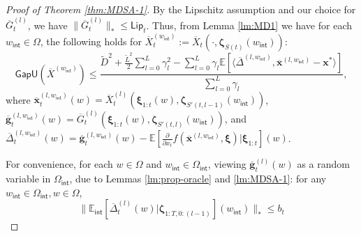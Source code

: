\documentclass[11pt,fullpage,letterpaper]{article}
\newcommand{\mb}{\mathbf}
\newcommand{\E}{\mathbb{E}}
\newcommand{\bx}{\boldsymbol{\xi}}
\newcommand{\bz}{\boldsymbol{\zeta}}
\newcommand{\internal}{\mathsf{int}}
\newcommand{\gapu}{\mathsf{GapU}}
\newcommand{\lips}{\mathsf{Lip}}
\begin{document}
\begin{proof}[Proof of Theorem \ref{thm:MDSA-1}]
By the Lipschitz assumption and our choice for $\overline{G}_t^{(l)}$, we have $\|\overline{G}_t^{(l)}\|_*\leq \lips_t$. Thus, from Lemma \ref{lm:MD1} 
we have for each $w_{\internal}\in \Omega$, the following holds for $\overline{X}_t^{(w_{\internal})}:= \overline{X}_t(\cdot,\bz_{S(t)}(w_{\internal}))$:
\begin{equation}\label{eq:main-pf-1}
        \gapu(\overline{X}^{(w_{\internal})}) \leq \frac{\widetilde{D}^2+ \frac{\tilde{L}^2}{2}\sum_{l=0}^L \gamma_l^2 -\sum_{l=0}^L\gamma_l \E[\langle \overline{\Delta}^{(l,w_{\internal})},\overline{\mb x}^{(l,w_{\internal})} - \mb x^* \rangle]}{\sum_{l=0}^L \gamma_l},
   \end{equation}
    where $\overline{\mb x}_t^{(l,w_{\internal})} (w)= \overline{X}_t^{(l)}(\bx_{1:t}(w),\bz_{S'(t,l-1)}(w_{\internal}))$, $\overline{\mb g}_t^{(l,w_{\internal})} (w)= \overline{G}_t^{(l)}(\bx_{1:t}(w),\bz_{S'(t,l)}(w_{\internal}))$, and $\overline{\Delta}^{(l,w_{\internal})}_t(w)=\overline{\mb g}^{(l,w_{\internal})}_t(w)-\E[\frac{\partial}{\partial x_t}f(\overline{\mb x}^{(l,w_{\internal})},\bx)|\bx_{1:t}](w)$.

    For convenience, for each $w\in \Omega$ and $w_{\internal}\in \Omega_{\internal}$, viewing $\overline{\mb g}_t^{(l)} (w)$ as a random variable in $\Omega_{\internal}$, due to Lemmas \ref{lm:prop-oracle} and \ref{lm:MDSA-1}: for any $w_{\internal}\in \Omega_{\internal},w\in \Omega$,
    \begin{equation}\label{eq:delta-prop1}
        \|\E_{\internal}[\overline{\Delta}^{(l)}_t(w)|\bz_{1:T,0:(l-1)}](w_{\internal})  \|_*\leq b_t
    \end{equation}



\end{proof}
\end{document}
